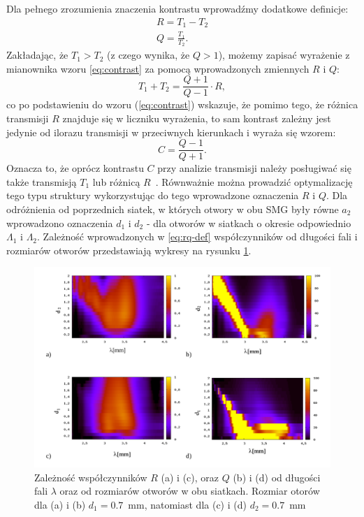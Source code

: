 Dla pełnego zrozumienia znaczenia kontrastu wprowadźmy dodatkowe definicje:
\begin{equation}
	\begin{gathered}
	R=T_1-T_2 \\
	Q=\frac{T_1}{T_2}.
	\end{gathered}
	\label{eq:rq-def}
\end{equation}
Zakładając, że $T_1>T_2$ (z czego wynika, że $Q>1$), możemy zapisać wyrażenie z mianownika wzoru \ref{eq:contrast} za pomocą wprowadzonych zmiennych $R$ i $Q$:
\begin{equation}
	T_1+T_2=\frac{Q+1}{Q-1} \cdot R,
\end{equation}
co po podstawieniu do wzoru (\ref{eq:contrast}) wskazuje, że pomimo tego, że różnica transmisji $R$  znajduje się w liczniku wyrażenia, to sam kontrast zależny jest jedynie od ilorazu transmisji w przeciwnych kierunkach i wyraża się wzorem:
\begin{equation}
	C=\frac{Q-1}{Q+1}
	\label{eq:contrast-Q}.
\end{equation}
Oznacza to, że oprócz kontrastu $C$ przy analizie transmisji należy posługiwać się także transmisją $T_1$ lub różnicą $R$~\cite{stolarek2013broadband}. Równważnie można prowadzić optymalizację tego typu struktury wykorzystując do tego wprowadzone oznaczenia $R$ i $Q$. Dla odróżnienia od poprzednich siatek, w których otwory w obu SMG były równe $a_2$ wprowadzono oznaczenia $d_1$ i $d_2$ - dla otworów w siatkach o okresie odpowiednio $\Lambda_1$ i $\Lambda_2$. Zależność wprowadzonych w \ref{eq:rq-def} współczynników od długości fali i rozmiarów otworów przedstawiają wykresy na rysunku \ref{fig:qr-od-d}.

\begin{figure}[tb]
	\includegraphics[width=\textwidth]{images/dmg/kontrast_maps.png}
	\caption{Zależność współczynników $R$ (a) i (c), oraz $Q$ (b) i (d) od długości fali $\lambda$ oraz od rozmiarów otworów w obu siatkach. Rozmiar otorów dla (a) i (b) $d_1=0.7$~mm, natomiast dla (c) i (d) $d_2=0.7$~mm }
	\label{fig:qr-od-d}
\end{figure}

